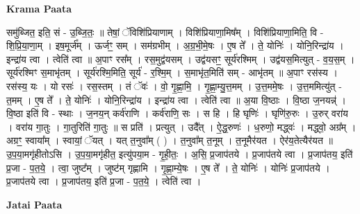 \documentclass[17pt]{extarticle}
\begin{document}
\textbf{Krama Paata} \newline

समु॑ब्जित॒ इति॒ सं - उ॒ब्जि॒तः॒ ॥ तेषां॒ ॅविशि॑प्रियाणाम् । विशि॑प्रियाणा॒मिष᳚म् । विशि॑प्रियाणा॒मिति॒ वि - शि॒प्रि॒या॒णा॒म् । इष॒मूर्ज᳚म् । ऊर्जꣳ॒॒ सम् । सम॑ग्रभीम् । अ॒ग्र॒भी॒मे॒षः । ए॒ष ते᳚ । ते॒ योनिः॑ । योनि॒रिन्द्रा॑य । इन्द्रा॑य त्वा । त्वेति॑ त्वा ॥ अ॒पाꣳ रस᳚म् । रस॒मुद्व॑यसम् । उद्व॑यसꣳ॒॒ सूर्य॑रश्मिम् । उद्व॑यस॒मित्युत् - व॒य॒स॒म् । सूर्य॑रश्मिꣳ स॒माभृ॑तम् । सूर्य॑रश्मि॒मिति॒ सूर्य॑ - र॒श्मि॒म् । स॒माभृ॑त॒मिति॑ सम् - आभृ॑तम् ॥ अ॒पाꣳ रस॑स्य । रस॑स्य॒ यः । यो रसः॑ । रस॒स्तम् । तं ॅवः॑ । वो॒ गृ॒ह्णा॒मि॒ । गृ॒ह्णा॒म्यु॒त्त॒मम् । उ॒त्त॒ममे॒षः । उ॒त्त॒ममित्यु॑त् - त॒मम् । ए॒ष ते᳚ । ते॒ योनिः॑ । योनि॒रिन्द्रा॑य । इन्द्रा॑य त्वा । त्वेति॑ त्वा ॥ अ॒या वि॒ष्ठाः । वि॒ष्ठा ज॒नयन्न्॑ । वि॒ष्ठा इति॑ वि - स्थाः । ज॒नय॒न् कर्व॑राणि । कर्व॑राणि॒ सः । स हि । हि घृणिः॑ । घृणि॑रु॒रुः । उ॒रुर् वरा॑य । वरा॑य गा॒तुः । गा॒तुरिति॑ गा॒तुः ॥ स प्रति॑ । प्रत्युत् । उदै᳚त् । ऐ॒द्ध॒रुणः॑ । ध॒रुणो॒ मद्ध्वः॑ । मद्ध्वो॒ अग्र᳚म् । अग्रꣳ॒॒ स्वाया᳚म् । स्वायां॒ ॅयत् । यत् त॒नुवा᳚म् ( ) । त॒नुवा᳚म् त॒नूम् । त॒नूमैर॑यत । ऐर॑य॒तेत्यैर॑यत ॥ उ॒प॒या॒मगृ॑हीतोऽसि । उ॒प॒या॒मगृ॑हीत॒ इत्यु॑पया॒म - गृ॒ही॒तः॒ । अ॒सि॒ प्र॒जाप॑तये । प्र॒जाप॑तये त्वा । प्र॒जाप॑तय॒ इति॑ प्र॒जा - प॒त॒ये॒ । त्वा॒ जुष्ट᳚म् । जुष्ट॑म् गृह्णामि । गृ॒ह्णा॒म्ये॒षः । ए॒ष ते᳚ । ते॒ योनिः॑ । योनिः॑ प्र॒जाप॑तये । प्र॒जाप॑तये त्वा । प्र॒जाप॑तय॒ इति॑ प्र॒जा - प॒त॒ये॒ । त्वेति॑ त्वा । \newline

\textbf{Jatai Paata} \newline
\end{document}

